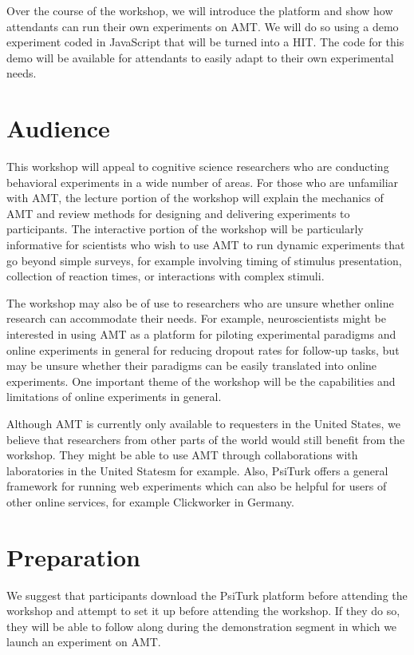 \documentclass[10pt,letterpaper]{article}
\begin{document}
Over the course of the workshop, we will introduce the platform and show how
attendants can run their own experiments on {AMT}. We will do so using a demo
experiment coded in JavaScript that will be turned into a {HIT}. The code for this demo will
be available for attendants to easily adapt to their own experimental needs.

\section{Audience}
This workshop will appeal to cognitive science researchers who are conducting
behavioral experiments in a wide number of areas. For those who are unfamiliar
with AMT, the lecture portion of the workshop will explain the mechanics of AMT
and review methods for designing and delivering experiments to participants.  The
interactive portion of the workshop will be particularly informative for
scientists who wish to use AMT to run dynamic experiments that go beyond
simple surveys, for example involving timing of stimulus presentation, collection of reaction times, or interactions with complex stimuli.

The workshop may also be of use to researchers who are unsure whether online
research can accommodate their needs. For example, neuroscientists might be
interested in using AMT as a platform for piloting experimental paradigms and
online experiments in general for reducing dropout rates for follow-up tasks, but
may be unsure whether their paradigms can be easily translated into online
experiments. One important theme of the workshop will be the capabilities and
limitations of online experiments in general.

Although AMT is currently only available to requesters in the United States, we believe that  researchers from other parts of the world would still benefit from the workshop. They might be able to use AMT through collaborations with laboratories in the United Statesm for example. Also, PsiTurk  offers a general framework for running web experiments which can also be helpful for users of other online services, for example Clickworker in Germany.


\section{Preparation}
We suggest that participants download the PsiTurk platform before attending the
workshop and attempt to set it up before attending the workshop. If they do so,
they will be able to follow along during the demonstration segment in which we launch an experiment on AMT.
\end{document}
